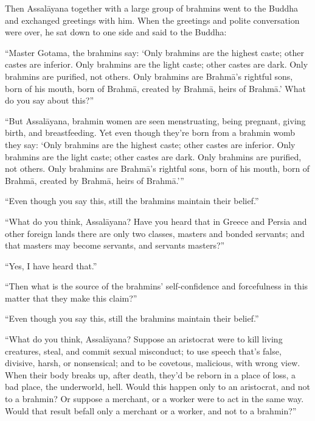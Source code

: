 \documentclass[12pt,openany]{book}%
\begin{document}
Then \textsanskrit{Assalāyana} together with a large group of brahmins went to the Buddha and exchanged greetings with him. When the greetings and polite conversation were over, he sat down to one side and said to the Buddha: 

“Master Gotama, the brahmins say: ‘Only brahmins are the highest caste; other castes are inferior. Only brahmins are the light caste; other castes are dark. Only brahmins are purified, not others. Only brahmins are \textsanskrit{Brahmā}’s rightful sons, born of his mouth, born of \textsanskrit{Brahmā}, created by \textsanskrit{Brahmā}, heirs of \textsanskrit{Brahmā}.’ What do you say about this?” 

“But \textsanskrit{Assalāyana}, brahmin women are seen menstruating, being pregnant, giving birth, and breastfeeding. Yet even though they’re born from a brahmin womb they say: ‘Only brahmins are the highest caste; other castes are inferior. Only brahmins are the light caste; other castes are dark. Only brahmins are purified, not others. Only brahmins are \textsanskrit{Brahmā}’s rightful sons, born of his mouth, born of \textsanskrit{Brahmā}, created by \textsanskrit{Brahmā}, heirs of \textsanskrit{Brahmā}.’” 

“Even though you say this, still the brahmins maintain their belief.” 

“What do you think, \textsanskrit{Assalāyana}? Have you heard that in Greece and Persia and other foreign lands there are only two classes, masters and bonded servants; and that masters may become servants, and servants masters?” 

“Yes, I have heard that.” 

“Then what is the source of the brahmins’ self-confidence and forcefulness in this matter that they make this claim?” 

“Even though you say this, still the brahmins maintain their belief.” 

“What do you think, \textsanskrit{Assalāyana}? Suppose an aristocrat were to kill living creatures, steal, and commit sexual misconduct; to use speech that’s false, divisive, harsh, or nonsensical; and to be covetous, malicious, with wrong view. When their body breaks up, after death, they’d be reborn in a place of loss, a bad place, the underworld, hell. Would this happen only to an aristocrat, and not to a brahmin? Or suppose a merchant, or a worker were to act in the same way. Would that result befall only a merchant or a worker, and not to a brahmin?” 
\end{document}
